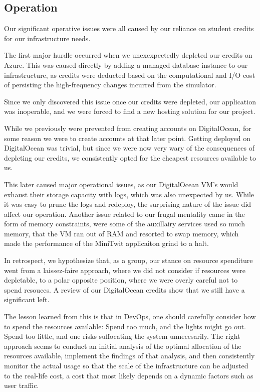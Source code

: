 \subsection{Operation}

Our significant operative issues were all caused by our reliance on student credits for our infrastructure needs.

The first major hurdle occurred when we unexexpectedly depleted our credits on Azure. This was caused directly by adding a managed database instance to our infrastructure, as credits were deducted based on the computational and I/O cost of persisting the high-frequency changes incurred from the simulator.

Since we only discovered this issue once our credits were depleted, our application was inoperable, and we were forced to find a new hosting solution for our project.

While we previously were prevented from creating accounts on DigitalOcean, for some reason we were to create accounts at that later point.
Getting deployed on DigitalOcean was trivial, but since we were now very wary of the consequences of depleting our credits, we consistently opted for the cheapest resources available to us.

This later caused major operational issues, as our DigitalOcean VM's would exhaust their storage capacity with logs, which was also unexpected by us.
While it was easy to prune the logs and redeploy, the surprising nature of the issue did affect our operation.
Another issue related to our frugal mentality came in the form of memory constraints, were some of the auxillairy services used so much memory, that the VM ran out of RAM and resorted to swap memory, which made the performance of the MiniTwit applicaiton grind to a halt.

In retrospect, we hypothesize that, as a group, our stance on resource spenditure went from a laissez-faire approach, where we did not consider if resources were depletable, to a polar opposite position, where we were overly careful not to spend resouces.
A review of our DigitalOcean credits show that we still have a significant left.

The lesson learned from this is that in DevOps, one should carefully consider how to spend the resources available: Spend too much, and the lights might go out. Spend too little, and one risks suffocating the system unnecesarily.
The right approach seems to conduct an initial analysis of the optimal allocation of the resources available, implement the findings of that analysis, and then consistently monitor the actual usage so that the scale of the infrastructure can be adjusted to the real-life cost, a cost that most likely depends on a dynamic factors such as user traffic.


